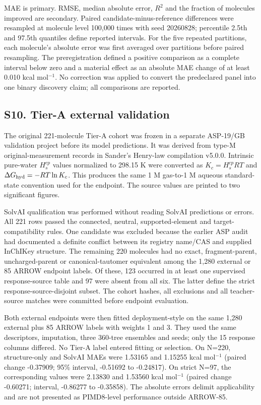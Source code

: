 \documentclass[10pt]{article}
\begin{document}
MAE is primary. RMSE, median absolute error, $R^2$ and the fraction of molecules
improved are secondary. Paired candidate-minus-reference differences were resampled
at molecule level 100,000 times with seed 20260828; percentile 2.5th and 97.5th
quantiles define reported intervals. For the five repeated partitions, each
molecule's absolute error was first averaged over partitions before paired
resampling. The preregistration defined a positive comparison as a complete interval
below zero and a material effect as an absolute MAE change of at least 0.010 kcal
mol$^{-1}$. No correction was applied to convert the predeclared panel into one
binary discovery claim; all comparisons are reported.

\subsection*{S10. Tier-A external validation}

The original 221-molecule Tier-A cohort was frozen in a separate ASP-19/GB validation
project before its model predictions. It was derived from type-M original-measurement
records in Sander's Henry-law compilation v5.0.0. Intrinsic pure-water
$H_s^{cp}$ values normalized to 298.15 K were converted as
$K_c=H_s^{cp}RT$ and $\Delta G_{\rm hyd}=-RT\ln K_c$. This produces the same 1 M
gas-to-1 M aqueous standard-state convention used for the endpoint. The source values
are printed to two significant figures.

SolvAI qualification was performed without reading SolvAI predictions or errors. All
221 rows passed the connected, neutral, supported-element and target-compatibility
rules. One candidate was excluded because the earlier ASP audit had documented a
definite conflict between its registry name/CAS and supplied InChIKey structure. The
remaining 220 molecules had no exact, fragment-parent, uncharged-parent or
canonical-tautomer equivalent among the 1,280 external or 85 ARROW endpoint labels.
Of these, 123 occurred in at least one supervised response-source table and 97 were
absent from all six. The latter define the strict response-source-disjoint subset.
The cohort hashes, all exclusions and all teacher-source matches were committed before
endpoint evaluation.

Both external endpoints were then fitted deployment-style on the same 1,280 external
plus 85 ARROW labels with weights 1 and 3. They used the same descriptors, imputation,
three 360-tree ensembles and seeds; only the 15 response columns differed. No Tier-A
label entered fitting or selection. On N=220, structure-only and SolvAI MAEs were
1.53165 and 1.15255 kcal mol$^{-1}$ (paired change -0.37909; 95\% interval,
-0.51692 to -0.24817). On strict N=97, the corresponding values were 2.13830 and
1.53560 kcal mol$^{-1}$ (paired change -0.60271; interval, -0.86277 to -0.35858).
The absolute errors delimit applicability and are not presented as PIMD8-level
performance outside ARROW-85.
\end{document}

